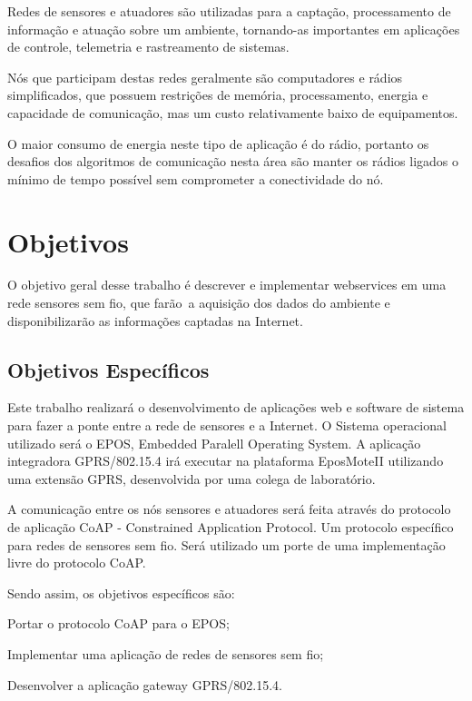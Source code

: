 Redes de sensores e atuadores s\~ao utilizadas para a capta\c{c}\~ao, processamento de informa\c{c}\~ao e atua\c{c}\~ao sobre um ambiente, tornando-as importantes em aplica\c{c}\~oes de controle, telemetria e rastreamento de sistemas.

N\'os que participam destas redes geralmente s\~ao computadores e r\'adios simplificados, que possuem restri\c{c}\~oes de mem\'oria, processamento, energia e capacidade de comunica\c{c}\~ao, mas um custo relativamente baixo de equipamentos.

O maior consumo de energia neste tipo de aplica\c{c}\~ao \'e do r\'adio, portanto os desafios dos algoritmos de comunica\c{c}\~ao nesta \'area s\~ao manter os r\'adios ligados o m\'inimo de tempo poss\'ivel sem comprometer a conectividade do n\'o.

\section{Objetivos}
O objetivo geral desse trabalho \'e descrever e implementar webservices em uma rede sensores sem fio, que far\~ao\
a aquisi\c{c}\~ao dos dados do ambiente e disponibilizar\~ao as informa\c{c}\~oes captadas na Internet.

\subsection{Objetivos Espec\'ificos}
Este trabalho realizar\'a o desenvolvimento de aplica\c{c}\~oes web e software de sistema para fazer a ponte entre a rede de sensores e a Internet. O Sistema operacional utilizado ser\'a o EPOS, Embedded Paralell Operating System. A aplica\c{c}\~ao integradora GPRS/802.15.4 ir\'a executar na plataforma EposMoteII utilizando uma extens\~ao GPRS, desenvolvida por uma colega de laborat\'orio.

A comunica\c{c}\~ao entre os n\'os sensores e atuadores ser\'a feita atrav\'es do protocolo de aplica\c{c}\~ao CoAP - Constrained Application Protocol. Um protocolo espec\'ifico para redes de sensores sem fio. Ser\'a utilizado um porte de uma implementa\c{c}\~ao livre do protocolo CoAP.

Sendo assim, os objetivos espec\'ificos s\~ao:
\begin{inparaenum}
\item Portar o protocolo CoAP para o EPOS;
\item Implementar uma aplica\c{c}\~ao de redes de sensores sem fio;
\item Desenvolver a aplica\c{c}\~ao gateway GPRS/802.15.4.
\end{inparaenum}

